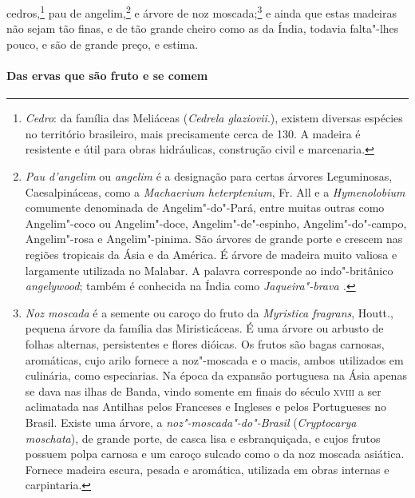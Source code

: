 cedros,\footnote{ \textit{Cedro}: da família das Meliáceas 
(\textit{Cedrela glaziovii}.), existem diversas espécies no território
brasileiro, mais precisamente cerca de 130. A madeira é resistente e
útil para obras hidráulicas, construção civil e marcenaria.} pau de
angelim,\footnote{ \textit{Pau d'angelim} ou \textit{angelim} é a
designação para certas árvores Leguminosas, Caesalpináceas, como a 
\textit{Machaerium heterptenium}, Fr. All e a \textit{Hymenolobium} 
comumente denominada de Angelim"-do"-Pará, entre muitas outras como
Angelim"-coco ou Angelim"-doce, Angelim"-de"-espinho, Angelim"-do"-campo,
Angelim"-rosa e Angelim"-pinima. São árvores de grande porte e crescem
nas regiões tropicais da Ásia e da América. É árvore de madeira muito
valiosa e largamente utilizada no Malabar. A palavra corresponde ao
indo"-britânico \textit{angelywood}; também é conhecida na Índia como
\textit{Jaqueira"-brava .} } e árvore de noz moscada;\footnote{ \textit{Noz moscada} 
é a semente ou caroço do fruto da \textit{Myristica fragrans}, Houtt., pequena árvore da família das
Miristicáceas. É uma árvore ou arbusto de folhas alternas, persistentes
e flores dióicas. Os frutos são bagas carnosas, aromáticas, cujo arilo
fornece a noz"-moscada e o macis, ambos utilizados em culinária, como
especiarias. Na época da expansão portuguesa na Ásia apenas se dava nas
ilhas de Banda, vindo somente em finais do século \textsc{xviii} a ser
aclimatada nas Antilhas pelos Franceses e Ingleses e pelos Portugueses
no Brasil. Existe uma árvore, a \textit{noz"-moscada"-do"-Brasil} (\textit{Cryptocarya moschata}), 
de grande porte, de casca lisa e esbranquiçada,
e cujos frutos possuem polpa carnosa e um caroço sulcado como o da noz
moscada asiática. Fornece madeira escura, pesada e aromática, utilizada
em obras internas e carpintaria.} e ainda que estas madeiras não sejam
tão finas, e de tão grande cheiro como as da Índia, todavia falta"-lhes
pouco, e são de grande preço, e estima.

\paragraph{Das ervas que são fruto e se comem}

